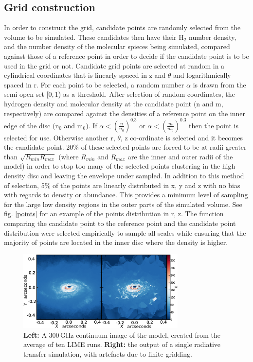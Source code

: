 \documentclass[useAMS,usenatbib]{mn2e}
\begin{document}
\subsection{Grid construction} \label{subsec:gridding}
In order to construct the grid, candidate points are randomly selected from the volume to be simulated. These candidates then have their H$_2$ number density, and the number density of the molecular spieces being simulated, compared against those of a reference point in order to decide if the candidate point is to be used in the grid or not. Candidate grid points are selected at random in a cylindrical coordinates that is linearly spaced in z and $\theta$ and logarithmically spaced in r. For each point to be selected, a random number $\alpha$ is drawn from the semi-open set [0,$\,$1) as a threshold. After selection of random coordinates, the hydrogen density and molecular density at the candidate point (n and m, respectively) are compared against the densities of a reference point on the inner edge of the disc (n$_0$ and m$_0$). If $\alpha<\left( \frac{n}{n_0} \right)^{0.3}$ or $\alpha< \left( \frac{m}{m_0} \right)^{0.3}$ then the point is selected for use. Otherwise another r, $\theta$, z co-ordinate is selected and it becomes the candidate point. 20\% of these selected points are forced to be at radii greater than $\sqrt{R_{min}R_{max}}$ (where $R_{min}$ and $R_{max}$ are the inner and outer radii of the model) in order to stop too many of the selected points clustering in the high density disc and leaving the envelope under sampled. In addition to this method of selection, 5\% of the points are linearly distributed in x, y and z with no bias with regards to density or abundance. This provides a minimum level of sampling for the large low density regions in the outer parts of the simulated volume. See fig. \ref{points} for an example of the points distribution in r, z. The function comparing the candidate point to the reference point and the candidate point distribution were selected empirically to sample all scales while ensuring that the majority of points are located in the inner disc where the density is higher.  \smallskip

\begin{figure}
 \includegraphics[width=84mm]{Figures/sim/fig06.eps}
 \caption{{\bf Left:} A 300$\,$GHz continuum image of the model, created from the average of ten LIME runs. {\bf Right:} the output of a single radiative transfer simulation, with artefacts due to finite gridding.}
 \label{averages}
\end{figure}
\end{document}
